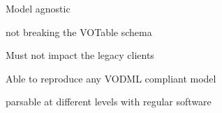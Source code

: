 Model agnostic

not breaking the VOTable schema

Must not impact the legacy clients

Able to reproduce any VODML compliant model

parsable at different levels with regular software